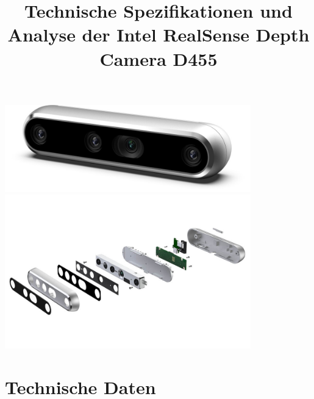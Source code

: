 \documentclass[a4paper,12pt]{article}
\title{Technische Spezifikationen und Analyse der Intel RealSense Depth Camera D455}
\author{}
\date{}
\begin{document}
\maketitle

\begin{center}
\includegraphics[width=0.8\textwidth]{./Bilder/d455_1.jpg}
\includegraphics[width=0.8\textwidth]{./Bilder/d455_2.jpg}
\end{center}

\section*{Technische Daten}
\end{document}
